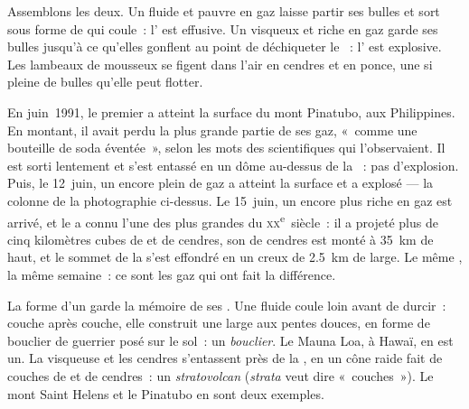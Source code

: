 Assemblons les deux. Un  fluide et pauvre en gaz laisse partir ses
bulles et sort sous forme de  qui coule~: l' est effusive. Un
 visqueux et riche en gaz garde ses bulles jusqu'à ce qu'elles
gonflent au point de déchiqueter le ~: l' est explosive. Les
lambeaux de  mousseux se figent dans l'air en cendres et en ponce, une
 si pleine de bulles qu'elle peut flotter.

\begin{example}\label{ex:g7:volcanoes:pinatubo}
En juin~1991, le premier  a atteint la surface du mont Pinatubo, aux
Philippines. En montant, il avait perdu la plus grande partie de ses gaz,
«~comme une bouteille de soda éventée~», selon les mots des scientifiques
qui l'observaient. Il est sorti lentement et s'est entassé en un dôme
au-dessus de la ~: pas d'explosion. Puis, le 12~juin, un 
encore plein de gaz a atteint la surface et a explosé --- la colonne de la
photographie ci-dessus. Le 15~juin, un  encore plus riche en gaz est
arrivé, et le  a connu l'une des plus grandes  du
\textsc{xx}\textsuperscript{e}~siècle~: il a projeté plus de cinq
kilomètres cubes de  et de cendres, son  de cendres est monté à
\qty{35}{km} de haut, et le sommet de la  s'est effondré en un
creux de \qty{2.5}{km} de large. Le même , la même semaine~: ce sont
les gaz qui ont fait la différence.
\end{example}

La forme d'un  garde la mémoire de ses . Une  fluide
coule loin avant de durcir~: couche après couche, elle construit une large
 aux pentes douces, en forme de bouclier de guerrier posé sur le
sol~: un \emph{ bouclier}. Le Mauna Loa, à Hawaï, en est un. La 
visqueuse et les cendres s'entassent près de la , en un cône raide
fait de couches de  et de cendres~: un \emph{stratovolcan}
(\emph{strata} veut dire «~couches~»). Le mont Saint Helens et le
Pinatubo en sont deux exemples.

